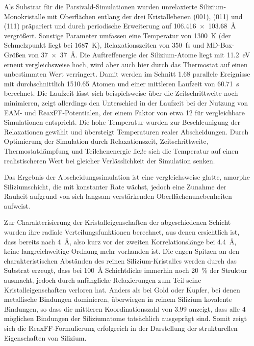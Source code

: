 Als Substrat für die Parsivald-Simulationen wurden unrelaxierte Silizium-Monokristalle mit Oberflächen entlang der drei Kristallebenen (001), (011) und (111) präpariert und durch periodische Erweiterung auf \SI{106.416x103.68}{\angstrom} vergrößert.
Sonstige Parameter umfassen eine Temperatur von \SI{1300}{\kelvin} (der Schmelzpunkt liegt bei \SI{1687}{\kelvin}), Relaxationszeiten von \SI{350}{\femto\second} und MD-Box-Größen von \SI{37x37}{\angstrom}.
Die Auftreffenergie der Silizium-Atome liegt mit \SI{11.2}{\electronvolt} erneut vergleichsweise hoch, wird aber auch hier durch das Thermostat auf einen unbestimmten Wert verringert.
Damit werden im Schnitt \num{1.68} parallele Ereignisse mit durchschnittlich \num{1510.65} Atomen und einer mittleren Laufzeit von \SI{60.71}{\second} berechnet.
Die Laufzeit lässt sich beispielsweise über die Zeitschrittweite noch minimieren, zeigt allerdings den Unterschied in der Laufzeit bei der Nutzung von EAM- und ReaxFF-Potentialen, der einem Faktor von etwa \num{12} für vergleichbare Simulationen entspricht.
Die hohe Temperatur wurden zur Beschleunigung der Relaxationen gewählt und übersteigt Temperaturen realer Abscheidungen.
Durch Optimierung der Simulation durch Relaxationszeit, Zeitschrittweite, Thermostatdämpfung und Teilchenenergie ließe sich die Temperatur auf einen realistischeren Wert bei gleicher Verlässlichkeit der Simulation senken.

Das Ergebnis der Abscheidungssimulation ist eine vergleichsweise glatte, amorphe Siliziumschicht, die mit konstanter Rate wächst, jedoch eine Zunahme der Rauheit aufgrund von sich langsam verstärkenden Oberflächenunebenheiten aufweist.

Zur Charakterisierung der Kristalleigenschaften der abgeschiedenen Schicht wurden ihre radiale Verteilungsfunktionen berechnet, aus denen ersichtlich ist, dass bereits nach \SI{4}{\angstrom}, also kurz vor der zweiten Korrelationslänge bei \SI{4.4}{\angstrom}, keine langreichweitige Ordnung mehr vorhanden ist.
Die engen Spitzen an den charakteristischen Abständen des reinen Silizium-Kristalles werden durch das Substrat erzeugt, dass bei \SI{100}{\angstrom} Schichtdicke immerhin noch \SI{20}{\percent} der Struktur ausmacht, jedoch durch anfängliche Relaxierungen zum Teil seine Kristalleigenschaften verloren hat.
Anders als bei Gold oder Kupfer, bei denen metallische Bindungen dominieren, überwiegen in reinem Silizium kovalente Bindungen, so dass die mittleren Koordinationszahl von \num{3.99} anzeigt, dass alle 4 möglichen Bindungen der Siliziumatome tatsächlich ausgeprägt sind.
Somit zeigt sich die ReaxFF-Formulierung erfolgreich in der Darstellung der strukturellen Eigenschaften von Silizium.

